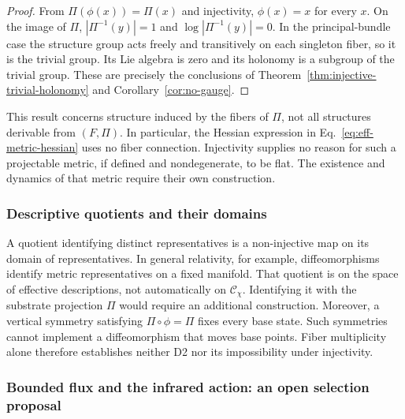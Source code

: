     \begin{proof}
      From $\Pi(\phi(x))=\Pi(x)$ and injectivity, $\phi(x)=x$ for every $x$.
      On the image of $\Pi$, $|\Pi^{-1}(y)|=1$ and $\log|\Pi^{-1}(y)|=0$.
      In the principal-bundle case the structure group acts freely and transitively on each singleton fiber,
      so it is the trivial group.
      Its Lie algebra is zero and its holonomy is a subgroup of the trivial group.
      These are precisely the conclusions of Theorem~\ref{thm:injective-trivial-holonomy}
      and Corollary~\ref{cor:no-gauge}.
    \end{proof}

    This result concerns structure induced by the fibers of $\Pi$, not all structures derivable from $(F,\Pi)$.
    In particular, the Hessian expression in Eq.~\eqref{eq:eff-metric-hessian} uses no fiber connection.
    Injectivity supplies no reason for such a projectable metric, if defined and nondegenerate, to be flat.
    The existence and dynamics of that metric require their own construction.

  \subsubsection*{Descriptive quotients and their domains}
    \label{subsec:lemma2}

    \begin{remark}
      \label{lem:redundancy-quotient}
      A quotient identifying distinct representatives is a non-injective map on its domain of representatives.
      In general relativity, for example, diffeomorphisms identify metric representatives on a fixed manifold.
      That quotient is on the space of effective descriptions, not automatically on $\mathcal{C}_\chi$.
      Identifying it with the substrate projection $\Pi$ would require an additional construction.
      Moreover, a vertical symmetry satisfying $\Pi\circ\phi=\Pi$ fixes every base state.
      Such symmetries cannot implement a diffeomorphism that moves base points.
      Fiber multiplicity alone therefore establishes neither D2 nor its impossibility under injectivity.
    \end{remark}

  \subsubsection*{Bounded flux and the infrared action: an open selection proposal}
    \label{subsec:lemma3}

